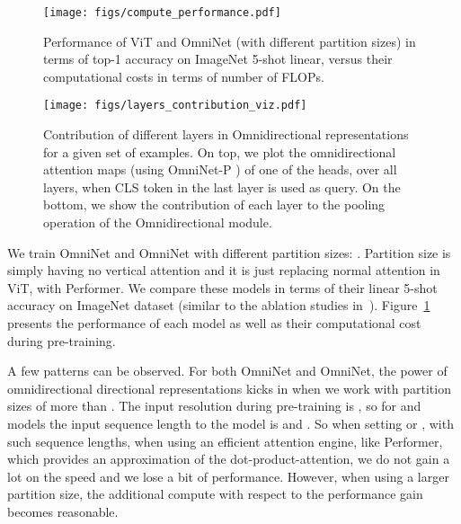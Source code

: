 \documentclass{article}
\begin{document}
\begin{figure}[t!]
\vspace{-11pt}
\begin{center}
\texttt{[image: figs/compute\_performance.pdf]}
\end{center}
\vspace{-15pt}
\caption{Performance of ViT and OmniNet (with different partition sizes) in terms of top-1 accuracy on ImageNet 5-shot linear, versus their computational costs in terms of number of FLOPs.}
\label{fig:OmniNet-ViT-ablation}
\vspace{-21pt}
\end{figure}

\begin{figure*}
    \centering
    \vspace{-5pt}
    \texttt{[image: figs/layers\_contribution\_viz.pdf]}
    \vspace{-23pt}
    \caption{Contribution of different layers in Omnidirectional representations for a given set of examples. On top, we plot the omnidirectional attention maps (using OmniNet-P ) of one of the heads, over all layers, when CLS token in the last layer is used as query. On the bottom, we show the contribution of each layer to the pooling operation of the Omnidirectional module.}
    \label{fig:layer_contributions_viz}
    \vspace{-15pt}
\end{figure*}

We train OmniNet and OmniNet with different partition sizes: . Partition size  is simply having no vertical attention and it is just replacing normal attention in ViT, with Performer. We compare these models in terms of their linear 5-shot accuracy on ImageNet dataset (similar to the ablation studies in~\citep{dosovitskiy2020image}). Figure~\ref{fig:OmniNet-ViT-ablation} presents the performance of each model as well as their computational cost during pre-training. 


A few patterns can be observed. For both OmniNet and OmniNet, the power of omnidirectional directional representations kicks in when we work with partition sizes of more than .  The input resolution during pre-training is , so for  and  models the input sequence length to the model is  and . So when setting  or ,  with such sequence lengths, when using an efficient attention engine, like Performer, which provides an approximation of the dot-product-attention, we do not gain a lot on the speed and we lose a bit of performance. However, when using a larger partition size, the additional compute with respect to the performance gain becomes reasonable. 
\end{document}

